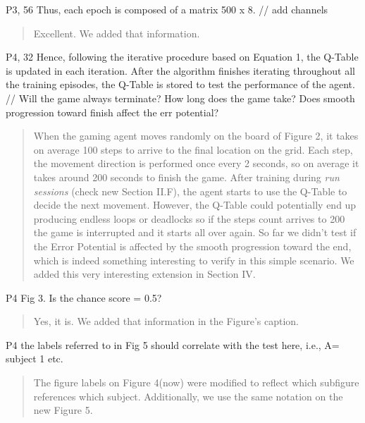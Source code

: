 \documentclass[journal,onecolumn,12pt]{IEEEtran}
\begin{document}
P3, 56 Thus, each epoch is composed of a matrix 500 x 8. // add channels

\vspace{2em}
\begin{quotation}
{\color{blue}
Excellent.  We added that information.
}
\end{quotation}
\vspace{2em}

P4, 32 Hence, following the iterative procedure based on Equation 1, the Q-Table is updated in each iteration. After the algorithm finishes iterating throughout all the training episodes, the Q-Table is stored to test the performance of the agent.
// Will the game always terminate? How long does the game take? Does smooth progression toward finish affect the err potential?

\vspace{2em}
\begin{quotation}
{\color{blue}

When the gaming agent moves randomly on the board of Figure 2, it takes on average 100 steps to arrive to the final location on the grid.  Each step, the movement direction is performed once every 2 seconds, so on average it takes around 200 seconds to finish the game.  After training during \textit{run sessions} (check new Section II.F), the agent starts to use the Q-Table to decide the next movement.  However, the Q-Table could potentially end up producing endless loops or deadlocks so if the steps count arrives to 200 the game is interrupted and it starts all over again.
So far we didn't test if the Error Potential is affected by the smooth progression toward the end, which is indeed something interesting to verify in this simple scenario.  We added this very interesting extension in Section IV.

}
\end{quotation}
\vspace{2em}

P4 Fig 3. Is the chance score = 0.5?

\vspace{2em}
\begin{quotation}
{\color{blue}
Yes, it is.  We added that information in the Figure's caption.
}
\end{quotation}
\vspace{2em}

P4 the labels referred to in Fig 5 should correlate with the test here, i.e., A= subject 1 etc.

\vspace{2em}
\begin{quotation}
{\color{blue}
The figure labels on Figure 4(now) were modified to reflect which subfigure references which subject.  Additionally, we use the same notation on the new Figure 5.
} 
\end{quotation}
\vspace{2em}
\end{document}
